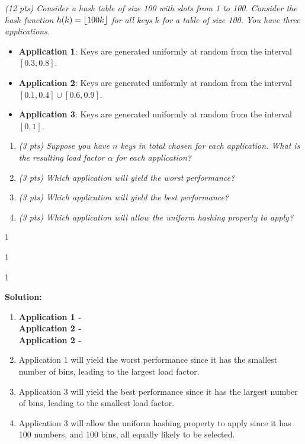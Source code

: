 \documentclass[9pt]{article}
\def\solutions{1}
\DeclarePairedDelimiter\floor{\lfloor}{\rfloor}
\newcommand{\ben}{\begin{enumerate}}
\newcommand{\een}{\end{enumerate}}
\begin{document}
\item { \itshape 
	    (12 pts) Consider a hash table of size 100 with slots from 1 to 100. Consider the hash function $h(k) = \floor*{100k}$ for all keys $k$ for a table of size 100. You have three applications.
	    \begin{itemize}
	        \item \textbf{Application 1}: Keys are  generated uniformly at random from the interval $[0.3, 0.8]$.
	        \item \textbf{Application 2}: Keys are  generated uniformly at random from the interval $[0.1, 0.4] \cup [0.6, 0.9]$.
	        \item \textbf{Application 3}: Keys are  generated uniformly at random from the interval $[0, 1]$.
	    \end{itemize}
	}
		\begin{enumerate}
		\item {\itshape (3 pts) Suppose you have $n$ keys in total chosen for each application. What is the resulting load factor $\alpha$ for each application? }
		
		\item {\itshape (3 pts) Which application will yield the worst performance? }
		
		\item {\itshape (3 pts) Which application will yield the best performance? }
		
		\item {\itshape (3 pts) Which application will allow the uniform hashing property to apply? }
		
    \end{enumerate}
\if\solutions1
\vspace{2mm}




\if\solutions1
\vspace{2mm}




\if\solutions1
\vspace{2mm}

\textbf{Solution:} \\
\ben 
	\item 
		\textbf{Application 1 - } \\ 
		\textbf{Application 2 - } \\
		\textbf{Application 2 - } \\	
	\item Application 1 will yield the worst performance since it has the smallest number of bins, leading to the largest load factor.
	\item Application 3 will yield the best performance since it has the largest number of bins, leading to the smallest load factor.
	\item Application 3 will allow the uniform hashing property to apply since it has 100 numbers, and 100 bins, all equally likely to be selected.
\een
\end{document}
